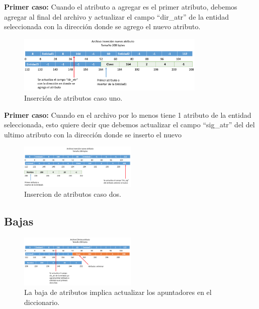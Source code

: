 {\bf Primer caso:} Cuando el atributo a agregar es el primer atributo, debemos agregar al final del archivo y actualizar el campo “dir\_atr” de la entidad seleccionada con la dirección donde se agrego el nuevo atributo.

\begin{figure}[!ht]
\begin{center}
  \includegraphics[width=0.8\textwidth]{secciones/ejemploA/InsercionAtributo1.png}
  \caption{Inserción de atributos caso uno.}
\end{center}
\end{figure}

{\bf Primer caso:} Cuando en el archivo por lo menos tiene 1 atributo de la entidad seleccionada, esto quiere decir que debemos actualizar el campo “sig\_atr” del del ultimo atributo con la dirección donde se inserto el nuevo

\begin{figure}[!ht]
\begin{center}
  \includegraphics[width=0.5\textwidth]{secciones/ejemploA/ad.png}
  \caption{Insercion de atributos caso dos.}
\end{center}
\end{figure}


\subsection{Bajas}


\begin{figure}[!ht]
\begin{center}
  \includegraphics[width=0.5\textwidth]{secciones/ejemploA/EliminaAtributo.png}
  \caption{La baja de atributos implica actualizar los apuntadores en el diccionario.}
\end{center}
\end{figure}

